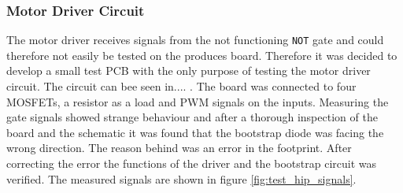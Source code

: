\subsubsection{Motor Driver Circuit}
The motor driver receives signals from the not functioning \texttt{NOT} gate and could therefore not easily be tested on the produces board.
Therefore it was decided to develop a small test PCB with the only purpose of testing the motor driver circuit.
The circuit can bee seen in.... .
The board was connected to four MOSFETs, a resistor as a load and PWM signals on the inputs. 
Measuring the gate signals showed strange behaviour and after a thorough inspection of the board and the schematic it was found that the bootstrap diode was facing the wrong direction. 
The reason behind was an error in the footprint. 
After correcting the error the functions of the driver and the bootstrap circuit was verified. 
The measured signals are shown in figure \ref{fig:test_hip_signals}.
%    
